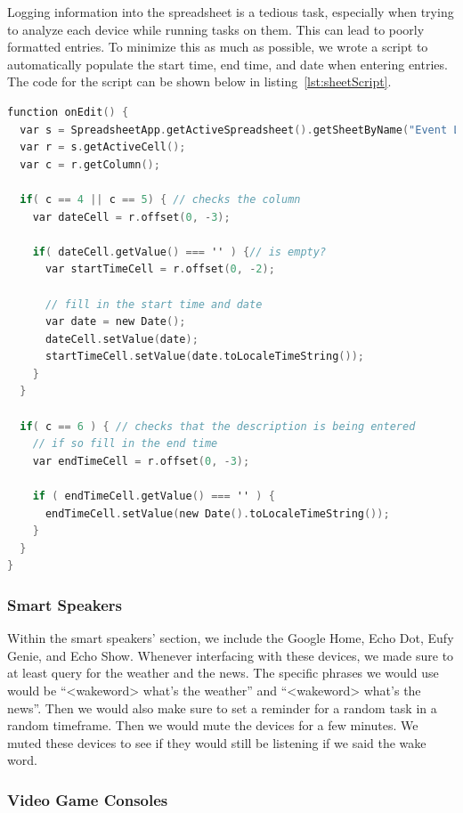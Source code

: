 Logging information into the spreadsheet is a tedious task, especially when trying to analyze each device while running tasks on them. This can lead to poorly formatted entries. To minimize this as much as possible, we wrote a script to automatically populate the start time, end time, and date when entering entries. The code for the script can be shown below in listing~\ref{lst:sheetScript}.

\begin{lstlisting}[language=C,label={lst:sheetScript},caption={Open and Read from a Socket},captionpos=b]
function onEdit() {
  var s = SpreadsheetApp.getActiveSpreadsheet().getSheetByName("Event Log");
  var r = s.getActiveCell();
  var c = r.getColumn();

  if( c == 4 || c == 5) { // checks the column
    var dateCell = r.offset(0, -3);

    if( dateCell.getValue() === '' ) {// is empty?
      var startTimeCell = r.offset(0, -2);

      // fill in the start time and date
      var date = new Date();
      dateCell.setValue(date);
      startTimeCell.setValue(date.toLocaleTimeString());
    }
  }

  if( c == 6 ) { // checks that the description is being entered
    // if so fill in the end time
    var endTimeCell = r.offset(0, -3);

    if ( endTimeCell.getValue() === '' ) {
      endTimeCell.setValue(new Date().toLocaleTimeString());
    }
  }
}
\end{lstlisting}

\subsubsection{Smart Speakers}

Within the smart speakers' section, we include the Google Home, Echo Dot, Eufy Genie, and Echo Show. Whenever interfacing with these devices, we made sure to at least query for the weather and the news. The specific phrases we would use would be ``<wakeword> what's the weather'' and ``<wakeword> what's the news''. Then we would also make sure to set a reminder for a random task in a random timeframe. Then we would mute the devices for a few minutes. We muted these devices to see if they would still be listening if we said the wake word.

\subsubsection{Video Game Consoles}

